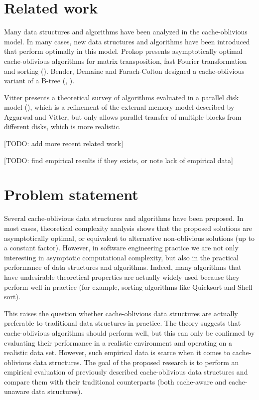 \documentclass{acm_proc_article-sp}
\begin{document}
\section{Related work}
Many data structures and algorithms have been analyzed in the cache-oblivious model. In many cases, new data structures and algorithms have been introduced that perform optimally in this model. Prokop presents asymptotically optimal cache-oblivious algorithms for matrix transposition, fast Fourier transformation and sorting (\cite{prokop1999coa}). Bender, Demaine and Farach-Colton designed a cache-oblivious variant of a B-tree (\cite{bender2005cob}, \cite{bender2004lpc}).

Vitter presents a theoretical survey of algorithms evaluated in a parallel disk model (\cite{vitter2001ema}), which is a refinement of the external memory model described by Aggarwal and Vitter, but only allows parallel transfer of multiple blocks from different disks, which is more realistic.

[TODO: add more recent related work]

[TODO: find empirical results if they exists, or note lack of empirical data]

\section{Problem statement}
Several cache-oblivious data structures and algorithms have been proposed. In most cases, theoretical complexity analysis shows that the proposed solutions are asymptotically optimal, or equivalent to alternative non-oblivious solutions (up to a constant factor). However, in software engineering practice we are not only interesting in asymptotic computational complexity, but also in the practical performance of data structures and algorithms. Indeed, many algorithms that have undesirable theoretical properties are actually widely used because they perform well in practice (for example, sorting algorithms like Quicksort and Shell sort).

This raises the question whether cache-oblivious data structures are actually preferable to traditional data structures in practice. The theory suggests that cache-oblivious algorithms should perform well, but this can only be confirmed by evaluating their performance in a realistic environment and operating on a realistic data set. However, such empirical data is scarce when it comes to cache-oblivious data structures. The goal of the proposed research is to perform an empirical evaluation of previously described cache-oblivious data structures and compare them with their traditional counterparts (both cache-aware and cache-unaware data structures).
\end{document}
